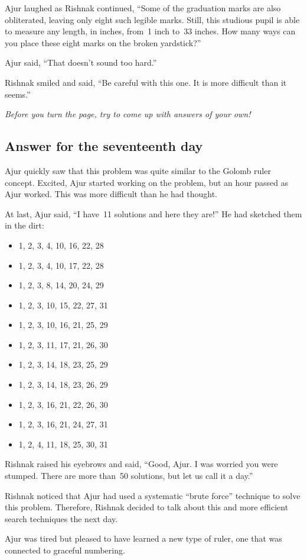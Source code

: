 Ajur laughed as Rishnak continued, ``Some of the graduation marks are also obliterated, leaving only eight such legible marks. Still, this studious pupil is able to measure any length, in inches, from~1 inch to~33 inches. How many ways can you place these eight marks on the broken yardstick?''

Ajur said, ``That doesn't sound too hard.''

Rishnak smiled and said, ``Be careful with this one. It is more difficult than it seems.''

\textit{Before you turn the page, try to come up with answers of your own!}

\newpage
\subsection*{Answer for the seventeenth day}
Ajur quickly saw that this problem was quite similar to the Golomb ruler concept. Excited, Ajur started working on the problem, but an hour passed as Ajur worked. This was more difficult than he had thought.

At last, Ajur said, ``I have~11 solutions and here they are!'' He had sketched them in the dirt:
\begin{itemize}
    \item 1, 2, 3, 4, 10, 16, 22, 28
    \item 1, 2, 3, 4, 10, 17, 22, 28
    \item 1, 2, 3, 8, 14, 20, 24, 29
    \item 1, 2, 3, 10, 15, 22, 27, 31
    \item 1, 2, 3, 10, 16, 21, 25, 29
     \item 1, 2, 3, 11, 17, 21, 26, 30
     \item 1, 2, 3, 14, 18, 23, 25, 29
     \item 1, 2, 3, 14, 18, 23, 26, 29
     \item 1, 2, 3, 16, 21, 22, 26, 30
     \item 1, 2, 3, 16, 21, 24, 27, 31
     \item 1, 2, 4, 11, 18, 25, 30, 31
\end{itemize}

Rishnak raised his eyebrows and said, ``Good, Ajur. I was worried you were stumped. There are more than~50 solutions, but let us call it a day.''

Rishnak noticed that Ajur had used a systematic ``brute force'' technique to solve this problem. Therefore, Rishnak decided to talk about this and more efficient search techniques the next day.

Ajur was tired but pleased to have learned a new type of ruler, one that was connected to graceful numbering.
